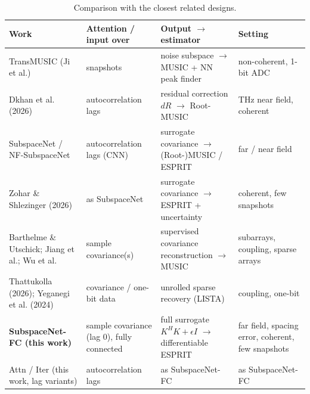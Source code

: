 \begin{table}[h!]
\centering
\small
\caption{Comparison with the closest related designs.}
\label{tab:positioning}
\begin{tabular}{>{\raggedright}p{3.9cm}>{\raggedright}p{2.6cm}>{\raggedright}p{4.6cm}>{\raggedright\arraybackslash}p{3.6cm}}
\toprule
Work & Attention / input over & Output $\to$ estimator & Setting \\
\midrule
TransMUSIC (Ji et al.) & snapshots & noise subspace $\to$ MUSIC + NN peak finder & non-coherent, 1-bit ADC \\
Dkhan et al. (2026) & autocorrelation lags & residual correction $dR$ $\to$ Root-MUSIC & THz near field, coherent \\
SubspaceNet / NF-SubspaceNet & autocorrelation lags (CNN) & surrogate covariance $\to$ (Root-)MUSIC / ESPRIT & far / near field \\
Zohar \& Shlezinger (2026) & as SubspaceNet & surrogate covariance $\to$ ESPRIT + uncertainty & coherent, few snapshots \\
Barthelme \& Utschick; Jiang et al.; Wu et al. & sample covariance(s) & supervised covariance reconstruction $\to$ MUSIC & subarrays, coupling, sparse arrays \\
Thattukolla (2026); Yeganegi et al. (2024) & covariance / one-bit data & unrolled sparse recovery (LISTA) & coupling, one-bit \\
\textbf{SubspaceNet-FC (this work)} & sample covariance (lag 0), fully connected & full surrogate $K^HK+\epsilon I$ $\to$ differentiable ESPRIT & far field, spacing error, coherent, few snapshots \\
Attn / Iter (this work, lag variants) & autocorrelation lags & as SubspaceNet-FC & as SubspaceNet-FC \\
\hline
\end{tabular}
\end{table}
